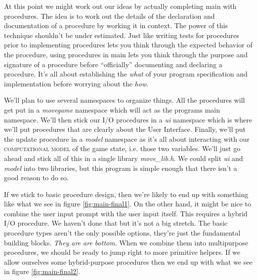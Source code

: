 \documentclass[nobib]{tufte-handout}
\begin{document}
At this point we might work out our ideas by actually completing main with procedures. The idea is to work out the details of the declaration and documentation of a procedure by working it in context. The power of this technique shouldn't be under estimated. Just like writing tests for procedures prior to implementing procedures lets you think through the expected behavior of the procedure, using procedures in main lets you think through the purpose and signature of a procedure before ``officially'' documenting and declaring a procedure. It's all about establishing the \textit{what} of your program specification and implementation before worrying about the \textit{how}. 

We'll plan to use several namespaces to organize things. All the procedures will get put in a \textit{movegame} namespace which will act as the programs main namespace.  We'll then stick our I/O procedures in a \textit{ui} namespace which is where we'll put procedures that are clearly about the User Interface. Finally, we'll put the update procedure in a \textit{model} namespace as it's all about interacting with our \textsc{computational model} of the game state, i.e. those two variables. We'll just go ahead and stick all of this in a single library \textit{move\_lib.h}. We could split \textit{ui} and \textit{model} into two libraries, but this program is simple enough that there isn't a good reason to do so.

If we stick to basic procedure design, then we're likely to end up with something like what we see in figure \ref{fig:main-final1}. On the other hand, it might be nice to combine the user input prompt with the user input itself. This requires a hybrid I/O procedure. We haven't done that but it's not a big stretch. The basic procedure types aren't the only possible options, they're just the fundamental building blocks.  \textit{They are are bottom}. When we combine them into multipurpose procedures, we should be ready to jump right to more primitive helpers. If we allow ourselves some hybrid-purpose procedures then we end up with what we see in figure \ref{fig:main-final2}.
\end{document}
